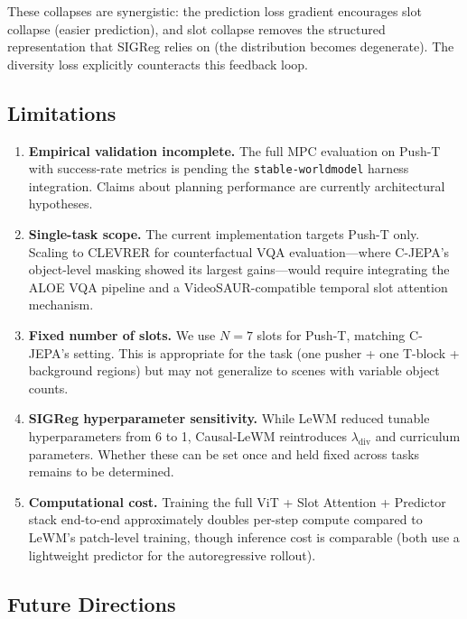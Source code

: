 \documentclass[12pt]{article}
\begin{document}
These collapses are synergistic: the prediction loss gradient encourages slot collapse (easier prediction), and slot collapse removes the structured representation that SIGReg relies on (the distribution becomes degenerate). The diversity loss explicitly counteracts this feedback loop.

\subsection{Limitations}

\begin{enumerate}[leftmargin=*]
    \item \textbf{Empirical validation incomplete.} The full MPC evaluation on Push-T with success-rate metrics is pending the \texttt{stable-worldmodel} harness integration. Claims about planning performance are currently architectural hypotheses.
    \item \textbf{Single-task scope.} The current implementation targets Push-T only. Scaling to CLEVRER for counterfactual VQA evaluation---where C-JEPA's object-level masking showed its largest gains---would require integrating the ALOE VQA pipeline and a VideoSAUR-compatible temporal slot attention mechanism.
    \item \textbf{Fixed number of slots.} We use $N=7$ slots for Push-T, matching C-JEPA's setting. This is appropriate for the task (one pusher + one T-block + background regions) but may not generalize to scenes with variable object counts.
    \item \textbf{SIGReg hyperparameter sensitivity.} While LeWM reduced tunable hyperparameters from 6 to 1, Causal-LeWM reintroduces $\lambda_{\text{div}}$ and curriculum parameters. Whether these can be set once and held fixed across tasks remains to be determined.
    \item \textbf{Computational cost.} Training the full ViT + Slot Attention + Predictor stack end-to-end approximately doubles per-step compute compared to LeWM's patch-level training, though inference cost is comparable (both use a lightweight predictor for the autoregressive rollout).
\end{enumerate}

\subsection{Future Directions}
\end{document}
